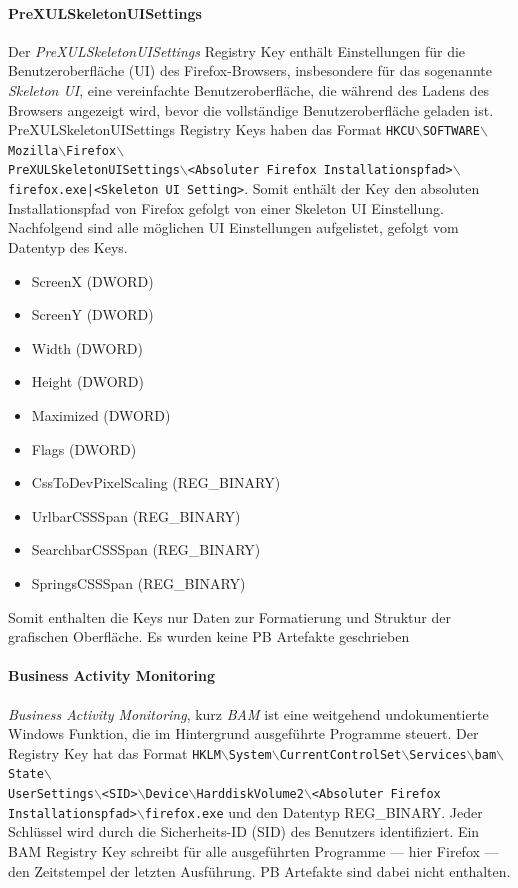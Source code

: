\begin{appendices}
\paragraph*{PreXULSkeletonUISettings}
Der \textit{PreXULSkeletonUISettings} Registry Key enthält Einstellungen für die Benutzeroberfläche (UI) des Firefox-Browsers, insbesondere für das sogenannte \textit{Skeleton UI}, eine vereinfachte Benutzeroberfläche, die während des Ladens des Browsers angezeigt wird, bevor die vollständige Benutzeroberfläche geladen ist. 
PreXULSkeletonUISettings Registry Keys haben das Format \texttt{HKCU$\backslash$SOFTWARE$\backslash$Mozilla$\backslash$Firefox$\backslash$\\PreXULSkeletonUISettings$\backslash$<Absoluter Firefox Installationspfad>$\backslash$firefox.exe|<Skeleton UI Setting>}.
Somit enthält der Key den absoluten Installationspfad von Firefox gefolgt von einer Skeleton UI Einstellung. Nachfolgend sind alle möglichen UI Einstellungen aufgelistet, gefolgt vom Datentyp des Keys. \cite{Mills.2021}
\begin{itemize}
	\item ScreenX (DWORD)
	\item ScreenY (DWORD)
	\item Width (DWORD)
	\item Height (DWORD)
	\item Maximized (DWORD)
	\item Flags (DWORD)
	\item CssToDevPixelScaling (REG\_BINARY)
	\item UrlbarCSSSpan (REG\_BINARY)
	\item SearchbarCSSSpan (REG\_BINARY)
	\item SpringsCSSSpan (REG\_BINARY)
\end{itemize}
Somit enthalten die Keys nur Daten zur Formatierung und Struktur der grafischen Oberfläche. Es wurden keine PB Artefakte geschrieben

\paragraph*{Business Activity Monitoring}
\textit{Business Activity Monitoring}, kurz \textit{BAM} ist eine weitgehend undokumentierte Windows Funktion, die im Hintergrund ausgeführte Programme steuert.
Der Registry Key hat das Format \texttt{HKLM$\backslash$System$\backslash$CurrentControlSet$\backslash$Services$\backslash$bam$\backslash$State$\backslash$\\UserSettings$\backslash$<SID>$\backslash$Device$\backslash$HarddiskVolume2$\backslash$<Absoluter Firefox Installationspfad>$\backslash$firefox.exe} und den Datentyp REG\_BINARY.
Jeder Schlüssel wird durch die Sicherheits-ID (SID) des Benutzers identifiziert.
Ein BAM Registry Key schreibt für alle ausgeführten Programme --- hier Firefox --- den Zeitstempel der letzten Ausführung.
PB Artefakte sind dabei nicht enthalten. \cite{MandiOhlinger.05.06.2023, InfoSecNotes.05.06.2023}


\end{appendices}

